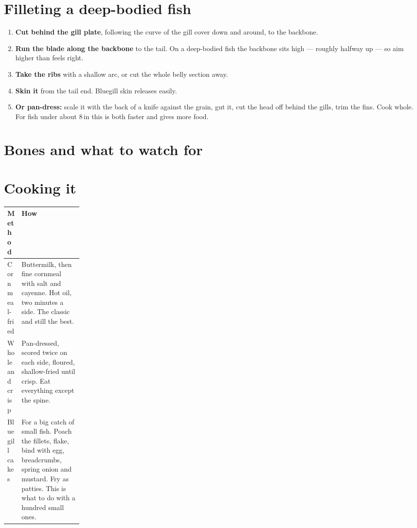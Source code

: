 \section{Filleting a deep-bodied fish}
\begin{enumerate}
\item \textbf{Cut behind the gill plate}, following the curve of the gill cover down and around, to the backbone.
\item \textbf{Run the blade along the backbone} to the tail. On a deep-bodied fish the backbone sits high --- roughly halfway up --- so aim higher than feels right.
\item \textbf{Take the ribs} with a shallow arc, or cut the whole belly section away.
\item \textbf{Skin it} from the tail end. Bluegill skin releases easily.
\item \textbf{Or pan-dress:} scale it with the back of a knife against the grain, gut it, cut the head off behind the gills, trim the fins. Cook whole. For fish under about 8\,in this is both faster and gives more food.
\end{enumerate}

\section{Bones and what to watch for}
\begin{telosfacts}[0.20]
\end{telosfacts}

\section{Cooking it}
\begin{tabularx}{\linewidth}{@{}p{0.18\linewidth}L@{}}
\toprule
\textbf{Method} & \textbf{How}\\
\midrule
Cornmeal-fried & Buttermilk, then fine cornmeal with salt and cayenne. Hot oil, two minutes a side. The classic and still the best.\\
Whole and crisp & Pan-dressed, scored twice on each side, floured, shallow-fried until crisp. Eat everything except the spine.\\
Bluegill cakes & For a big catch of small fish. Poach the fillets, flake, bind with egg, breadcrumbs, spring onion and mustard. Fry as patties. This is what to do with a hundred small ones.\\
\bottomrule
\end{tabularx}

